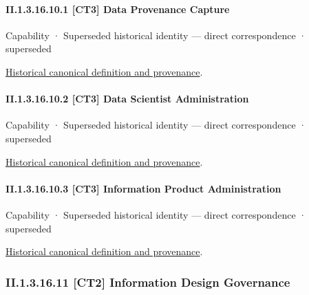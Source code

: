 \paragraph*{II.1.3.16.10.1 [CT3] Data Provenance Capture}
\label{navigation:II.1.3.16.10.1}

\label{element:61258c7fe41f4541871a67ec9d7185cf}
{\small Capability · Superseded historical identity — direct correspondence · superseded}\par
\href{../../../../continuum/strategy/capability/61258c7fe41f4541871a67ec9d7185cf.md}{Historical canonical definition and provenance}.\par
\paragraph*{II.1.3.16.10.2 [CT3] Data Scientist Administration}
\label{navigation:II.1.3.16.10.2}

\label{element:1cb497aec93c4b82ba7f5b622813e54e}
{\small Capability · Superseded historical identity — direct correspondence · superseded}\par
\href{../../../../continuum/strategy/capability/1cb497aec93c4b82ba7f5b622813e54e.md}{Historical canonical definition and provenance}.\par
\paragraph*{II.1.3.16.10.3 [CT3] Information Product Administration}
\label{navigation:II.1.3.16.10.3}

\label{element:5d9b7f8d2d7b41759b6d4931c1d2aaa2}
{\small Capability · Superseded historical identity — direct correspondence · superseded}\par
\href{../../../../continuum/strategy/capability/5d9b7f8d2d7b41759b6d4931c1d2aaa2.md}{Historical canonical definition and provenance}.\par
\subsubsection*{II.1.3.16.11 [CT2] Information Design Governance}
\label{navigation:II.1.3.16.11}

